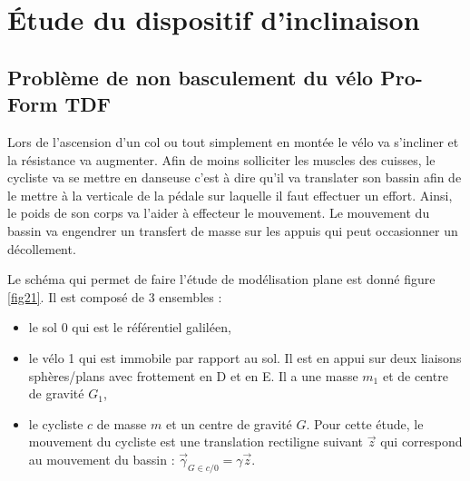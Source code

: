 

\section{Étude du dispositif d'inclinaison}

\subsection{Problème de non basculement du vélo Pro-Form TDF}


Lors de l'ascension d'un col ou tout simplement en montée le vélo va s'incliner et la résistance va augmenter. Afin de moins solliciter les muscles des cuisses, le cycliste va se mettre en danseuse c'est à dire qu'il va translater son bassin afin de le mettre à la verticale de la pédale sur laquelle il faut effectuer un effort. Ainsi, le poids de son corps va l'aider à effecteur le mouvement. Le mouvement du bassin va engendrer un transfert de masse sur les appuis qui peut occasionner un décollement.

\newpage

Le schéma qui permet de faire l'étude de modélisation plane est donné figure \ref{fig21}. Il est composé de 3 ensembles :
\begin{itemize}
 \item le sol 0 qui est le référentiel galiléen,
 \item le vélo 1 qui est immobile par rapport au sol. Il est en appui sur deux liaisons sphères/plans avec frottement en D et en E. Il a une masse $m_1$ et de centre de gravité $G_1$,
 \item le cycliste $c$ de masse $m$ et un centre de gravité $G$. Pour cette étude, le mouvement du cycliste est une translation rectiligne suivant $\vec{z}$ qui correspond au mouvement du bassin : $\vec{\gamma}_{G\in c/0}=\gamma\vec{z}$.
\end{itemize}

